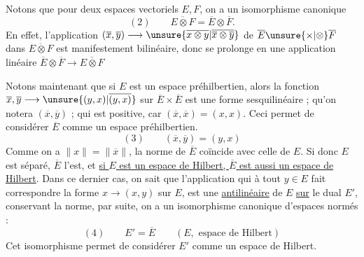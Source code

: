 Notons que pour deux espaces vectoriels $E,F$, on a un isomorphisme canonique
\[
(2)\qquad\overline{E\otimes F}=\overline E\otimes\overline F.
\]
En effet, l'application $(\overline x,\overline y)\longrightarrow\unsure{\overline{x\otimes y}|\overline{\overline x\otimes\overline y}}$ de $\overline E\unsure{\times|\otimes}\overline F$ dans $\overline{E\otimes F}$ est manifestement bilinéaire, donc se prolonge en une application linéaire $\overline E\otimes\overline F\longrightarrow\overline{E\otimes F}$

Notons maintenant que si $E$ est un espace préhilbertien, alors la fonction $\overline x,\overline y\longrightarrow\unsure{(y,x)|\overline{(y,x)}}$ sur $\overline E\times\overline E$ est une forme sesquilinéaire ; qu'on notera $(\overline x,\overline y)$ ; qui  est   positive, car $(\overline x,\overline x)=(x,x)$.
Ceci permet de considérer $\overline E$ comme un espace préhilbertien.
\[
(3)\qquad(\overline x,\overline y)=(y,x)
\]
Comme on a $\|x\|=\|\overline x\|$, la norme de $\overline E$ coïncide avec celle de $E$. Si donc $E$ est séparé, $\overline E$ l'est, et \uline{si $E$ est un espace de Hilbert, $\overline E$ est aussi un espace de Hilbert}.
Dans ce dernier cas, on sait que l'application qui à tout $y\in E$ fait correspondre la forme $x\longrightarrow(x,y)$ sur $E$, est une   \uline{antilinéaire} de $E$ \uline{sur} le dual $E'$, conservant la norme, par suite, on a   un isomorphisme canonique d'espaces normés :
\[
(4)\qquad E'=\overline E\qquad(E,\text{ espace de Hilbert})
\]
Cet isomorphisme permet de considérer $E'$ comme   un espace de Hilbert.
